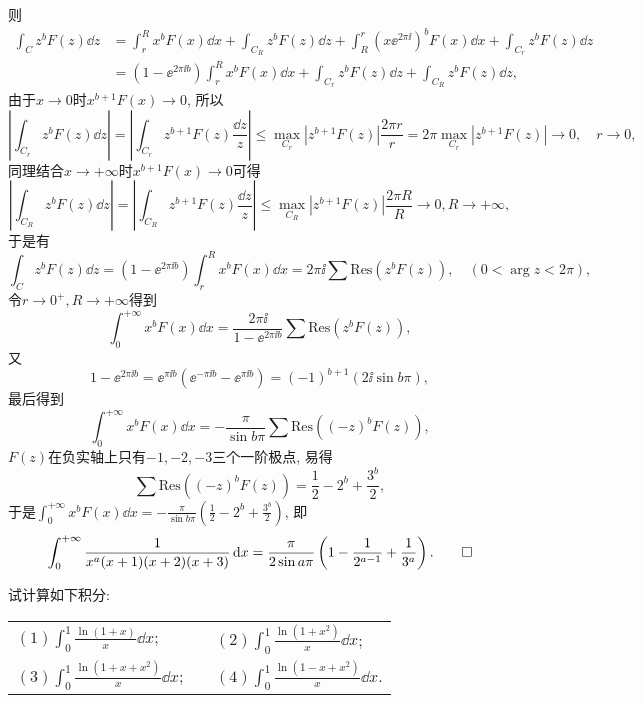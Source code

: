 \begin{quiza}
\begin{solution}
\begin{figure}[H]
\end{figure}
则\[\begin{split}
	\int_Cz^bF(z)\dd z&=\int_{r}^{R}x^bF(x)\dd x+\int_{C_R}z^bF(z)\dd z+\int_{R}^{r}\left(x\ee^{2\pi\ii}\right)^bF(x)\dd x+\int_{C_r}z^bF(z)\dd z\\&=\left(1-\ee^{2\pi\ii b}\right)\int_{r}^{R}x^bF(x)\dd x+\int_{C_r}z^bF(z)\dd z+\int_{C_R}z^bF(z)\dd z,
\end{split}\]由于\(x\rightarrow 0\)时\(x^{b+1}F(x)\rightarrow 0\), 所以
\[\left|\int_{C_r}z^bF(z)\dd z\right|=\left|\int_{C_r}z^{b+1}F(z)\frac{\dd z}{z}\right|\leqslant \max_{C_r}\left|z^{b+1}F(z)\right|\frac{2\pi r}{r}=2\pi\max_{C_r}\left|z^{b+1}F(z)\right|\rightarrow 0,\quad r\rightarrow 0,\]同理结合\(x\rightarrow+\infty\)时\(x^{b+1}F(x)\rightarrow 0\)可得\[\left|\int_{C_R}z^bF(z)\dd z\right|=\left|\int_{C_R}z^{b+1}F(z)\frac{\dd z}{z}\right|\leqslant \max_{C_R}\left|z^{b+1}F(z)\right|\frac{2\pi R}{R}\rightarrow 0,R\rightarrow+\infty,\]于是有\[\int_C z^bF(z)\dd z=(1-\ee^{2\pi\ii b})\int_{r}^{R}x^bF(x)\dd x=2\pi\ii\sum\mathrm{Res}\left(z^bF(z)\right),\quad (0<\arg z<2\pi),\]令\(r\rightarrow 0^+,R\rightarrow+\infty\)得到\[\int_{0}^{+\infty}x^bF(x)\dd x=\frac{2\pi\ii}{1-\ee^{2\pi\ii b}}\sum\mathrm{Res}\left(z^bF(z)\right),\]又
\[1-\ee^{2\pi\ii b}=\ee^{\pi\ii b}\left(\ee^{-\pi\ii b}-\ee^{\pi\ii b}\right)=(-1)^{b+1}\left(2\ii\sin b\pi\right),\]最后得到\[\int_{0}^{+\infty}x^bF(x)\dd x=-\frac{\pi}{\sin b\pi}\sum\mathrm{Res}\left((-z)^bF(z)\right),\]\(F(z)\)在负实轴上只有\(-1,-2,-3\)三个一阶极点, 易得\[\sum\mathrm{Res}\left((-z)^bF(z)\right)=\frac{1}{2}-2^b+\frac{3^b}{2},\]于是\(\int_{0}^{+\infty}x^bF(x)\dd x=-\frac{\pi}{\sin b\pi}\left(\frac{1}{2}-2^b+\frac{3^b}{2}\right)\), 即\[\int_0^{+\infty}\frac{1}{x^a(x+1)(x+2)(x+3)}\,\mathrm{d} x=\frac{\pi}{2\sin a\pi}\left(1-\frac{1}{2^{a-1}}+\frac{1}{3^a}\right).\qedhere\]
\end{solution}
\woe 试计算如下积分:\vspace{8pt}\\
\begin{tabular}{lcl}
\((1)\int_{0}^{1}\frac{\ln (1+x)}{x}\dd x\);&\qquad\qquad\qquad&\((2)\int_{0}^{1}\frac{\ln(1+x^2)}{x}\dd x\);\vspace{0.3cm}\\
\((3)\int_{0}^{1}\frac{\ln(1+x+x^2)}{x}\dd x\);&&\((4)\int_{0}^{1}\frac{\ln (1-x+x^2)}{x}\dd x\).
\end{tabular}

\end{quiza}
